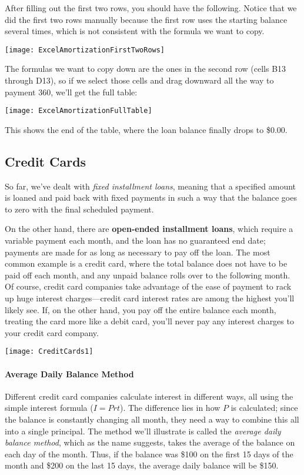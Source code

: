 After filling out the first two rows, you should have the following.  Notice that we did the first two rows manually because the first row uses the starting balance several times, which is not consistent with the formula we want to copy.
\begin{center}
\texttt{[image: ExcelAmortizationFirstTwoRows]}
\end{center}
\pagebreak

The formulas we want to copy down are the ones in the second row (cells B13 through D13), so if we select those cells and drag downward all the way to payment 360, we'll get the full table:
\begin{center}
\texttt{[image: ExcelAmortizationFullTable]}
\end{center}

This shows the end of the table, where the loan balance finally drops to \$0.00.

\subsection{Credit Cards}
So far, we've dealt with \textit{fixed installment loans}, meaning that a specified amount is loaned and paid back with fixed payments in such a way that the balance goes to zero with the final scheduled payment.

On the other hand, there are \textbf{open-ended installment loans}, which require a variable payment each month, and the loan has no guaranteed end date; payments are made for as long as necessary to pay off the loan.  The most common example is a credit card, where the total balance does not have to be paid off each month, and any unpaid balance rolls over to the following month.  Of course, credit card companies take advantage of the ease of payment to rack up huge interest charges---credit card interest rates are among the highest you'll likely see.  If, on the other hand, you pay off the entire balance each month, treating the card more like a debit card, you'll never pay any interest charges to your credit card company.
\begin{center}
\texttt{[image: CreditCards1]}
\end{center}

\paragraph{Average Daily Balance Method} Different credit card companies calculate interest in different ways, all using the simple interest formula ($I=Prt$).  The difference lies in how $P$ is calculated; since the balance is constantly changing all month, they need a way to combine this all into a single principal.  The method we'll illustrate is called the \textit{average daily balance method}, which as the name suggests, takes the average of the balance on each day of the month.  Thus, if the balance was \$100 on the first 15 days of the month and \$200 on the last 15 days, the average daily balance will be \$150.
\vfill
\pagebreak

